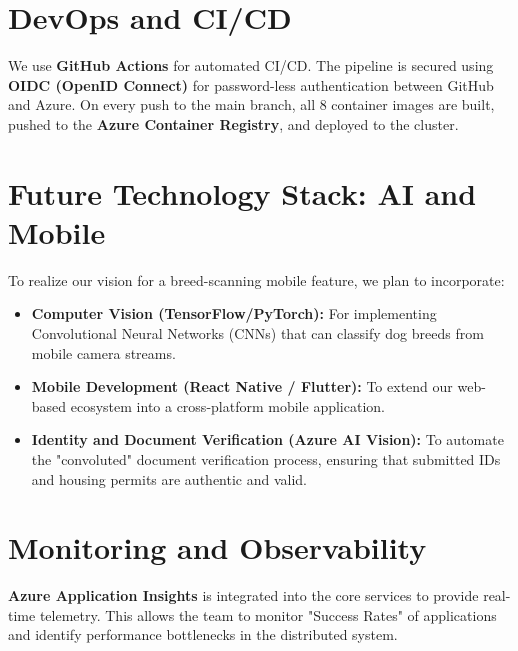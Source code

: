\section{DevOps and CI/CD}
We use \textbf{GitHub Actions} for automated CI/CD. The pipeline is secured using \textbf{OIDC (OpenID Connect)} for password-less authentication between GitHub and Azure. On every push to the main branch, all 8 container images are built, pushed to the \textbf{Azure Container Registry}, and deployed to the cluster.

\section{Future Technology Stack: AI and Mobile}
To realize our vision for a breed-scanning mobile feature, we plan to incorporate:
\begin{itemize}
    \item \textbf{Computer Vision (TensorFlow/PyTorch):} For implementing Convolutional Neural Networks (CNNs) that can classify dog breeds from mobile camera streams.
    \item \textbf{Mobile Development (React Native / Flutter):} To extend our web-based ecosystem into a cross-platform mobile application.
    \item \textbf{Identity and Document Verification (Azure AI Vision):} To automate the "convoluted" document verification process, ensuring that submitted IDs and housing permits are authentic and valid.
\end{itemize}

\section{Monitoring and Observability}
\textbf{Azure Application Insights} is integrated into the core services to provide real-time telemetry. This allows the team to monitor "Success Rates" of applications and identify performance bottlenecks in the distributed system.
